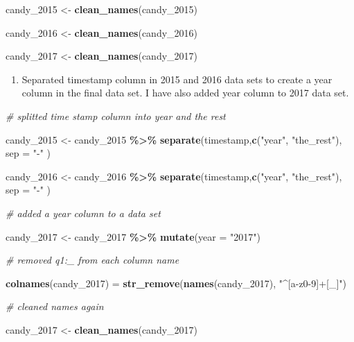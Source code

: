 \documentclass[
]{article}
\newenvironment{Shaded}{\begin{snugshade}}{\end{snugshade}}
\newcommand{\AttributeTok}[1]{\textcolor[rgb]{0.13,0.29,0.53}{#1}}
\newcommand{\CommentTok}[1]{\textcolor[rgb]{0.56,0.35,0.01}{\textit{#1}}}
\newcommand{\FunctionTok}[1]{\textcolor[rgb]{0.13,0.29,0.53}{\textbf{#1}}}
\newcommand{\NormalTok}[1]{#1}
\newcommand{\OtherTok}[1]{\textcolor[rgb]{0.56,0.35,0.01}{#1}}
\newcommand{\SpecialCharTok}[1]{\textcolor[rgb]{0.81,0.36,0.00}{\textbf{#1}}}
\newcommand{\StringTok}[1]{\textcolor[rgb]{0.31,0.60,0.02}{#1}}
\providecommand{\tightlist}{%
  \setlength{\itemsep}{0pt}\setlength{\parskip}{0pt}}
\begin{document}
\begin{Shaded}
\begin{Highlighting}[]
\NormalTok{candy\_2015 }\OtherTok{\textless{}{-}} \FunctionTok{clean\_names}\NormalTok{(candy\_2015)}

\NormalTok{candy\_2016 }\OtherTok{\textless{}{-}} \FunctionTok{clean\_names}\NormalTok{(candy\_2016) }

\NormalTok{candy\_2017 }\OtherTok{\textless{}{-}} \FunctionTok{clean\_names}\NormalTok{(candy\_2017) }
\end{Highlighting}
\end{Shaded}

\begin{enumerate}
\def\labelenumi{\arabic{enumi}.}
\setcounter{enumi}{1}
\tightlist
\item
  Separated timestamp column in 2015 and 2016 data sets to create a year
  column in the final data set. I have also added year column to 2017
  data set.
\end{enumerate}

\begin{Shaded}
\begin{Highlighting}[]
\CommentTok{\# splitted time stamp column into \textquotesingle{}year\textquotesingle{} and \textquotesingle{}the rest\textquotesingle{}}

\NormalTok{candy\_2015 }\OtherTok{\textless{}{-}}\NormalTok{ candy\_2015 }\SpecialCharTok{\%\textgreater{}\%} 
  \FunctionTok{separate}\NormalTok{(timestamp,}\FunctionTok{c}\NormalTok{(}\StringTok{"year"}\NormalTok{, }\StringTok{"the\_rest"}\NormalTok{), }\AttributeTok{sep =} \StringTok{"{-}"}\NormalTok{ )}

\NormalTok{candy\_2016 }\OtherTok{\textless{}{-}}\NormalTok{ candy\_2016 }\SpecialCharTok{\%\textgreater{}\%} 
  \FunctionTok{separate}\NormalTok{(timestamp,}\FunctionTok{c}\NormalTok{(}\StringTok{"year"}\NormalTok{, }\StringTok{"the\_rest"}\NormalTok{), }\AttributeTok{sep =} \StringTok{"{-}"}\NormalTok{ )}

\CommentTok{\#  added a year column to a data set}

\NormalTok{candy\_2017 }\OtherTok{\textless{}{-}}\NormalTok{ candy\_2017 }\SpecialCharTok{\%\textgreater{}\%} 
  \FunctionTok{mutate}\NormalTok{(}\AttributeTok{year =} \StringTok{"2017"}\NormalTok{)}

\CommentTok{\# removed \textquotesingle{}q1:\_\textquotesingle{} from each column name}

\FunctionTok{colnames}\NormalTok{(candy\_2017) }\OtherTok{=} \FunctionTok{str\_remove}\NormalTok{(}\FunctionTok{names}\NormalTok{(candy\_2017), }\StringTok{"\^{}[a{-}z0{-}9]+[\_]"}\NormalTok{)}

\CommentTok{\# cleaned names again}

\NormalTok{candy\_2017 }\OtherTok{\textless{}{-}} \FunctionTok{clean\_names}\NormalTok{(candy\_2017) }
\end{Highlighting}
\end{Shaded}
\end{document}
